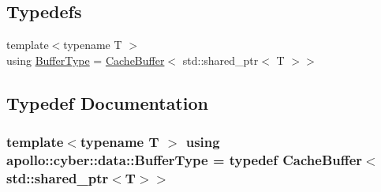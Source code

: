 \subsection*{Typedefs}
\begin{DoxyCompactItemize}
\item 
{\footnotesize template$<$typename T $>$ }\\using \hyperlink{namespaceapollo_1_1cyber_1_1data_ae056abe555ca2912078c5a8fe56ec0e6}{Buffer\-Type} = \hyperlink{classapollo_1_1cyber_1_1data_1_1CacheBuffer}{Cache\-Buffer}$<$ std\-::shared\-\_\-ptr$<$ T $>$$>$
\end{DoxyCompactItemize}


\subsection{Typedef Documentation}
\hypertarget{namespaceapollo_1_1cyber_1_1data_ae056abe555ca2912078c5a8fe56ec0e6}{
\subsubsection[{Buffer\-Type}]{\setlength{\rightskip}{0pt plus 5cm}template$<$typename T $>$ using {\bf apollo\-::cyber\-::data\-::\-Buffer\-Type} = typedef {\bf Cache\-Buffer}$<$std\-::shared\-\_\-ptr$<$T$>$$>$}}\label{namespaceapollo_1_1cyber_1_1data_ae056abe555ca2912078c5a8fe56ec0e6}
